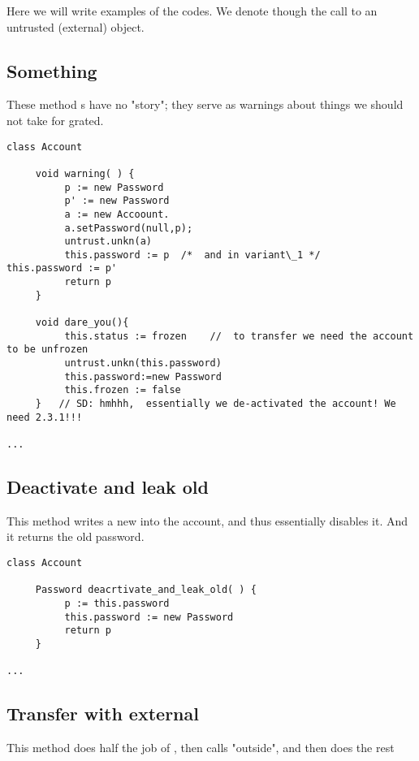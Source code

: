 Here we will write examples of the codes. We denote though  the call to an untrusted (external) object.


\subsection{Something}

These  method s have no "story"; they serve  as warnings about things we should not take for grated.

\begin{lstlisting}[language=chainmail, mathescape=true, frame=lines]
class Account

     void warning( ) {
          p := new Password
          p' := new Password
          a := new Accoount.
          a.setPassword(null,p);
          untrust.unkn(a)
          this.password := p  /*  and in variant\_1 */     this.password := p' 
          return p    
     }
     
     void dare_you(){
          this.status := frozen    //  to transfer we need the account to be unfrozen 
          untrust.unkn(this.password)
          this.password:=new Password
          this.frozen := false
     }   // SD: hmhhh,  essentially we de-activated the account! We need 2.3.1!!!
     
...
\end{lstlisting}


\subsection*{Deactivate and leak old}

This method writes a new  into the account, and thus essentially disables it. And it returns the old password.

\begin{lstlisting}[language=chainmail, mathescape=true, frame=lines]
class Account

     Password deacrtivate_and_leak_old( ) {
          p := this.password
          this.password := new Password
          return p    
     }
     
...
\end{lstlisting}

\subsection{Transfer with external}

This method  does half the job of  , then calls "outside", and then does the rest

